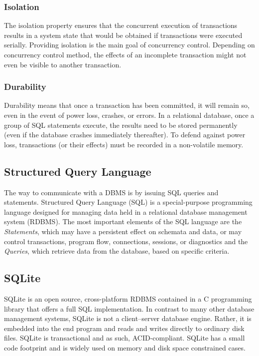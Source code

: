     \subsubsection{Isolation}
      The isolation property ensures that the concurrent execution of transactions results in a system state that would be obtained if transactions were executed serially. Providing isolation is the main goal of concurrency control. Depending on concurrency control method, the effects of an incomplete transaction might not even be visible to another transaction.

    \subsubsection{Durability}
      Durability means that once a transaction has been committed, it will remain so, even in the event of power loss, crashes, or errors. In a relational database, once a group of SQL statements execute, the results need to be stored permanently (even if the database crashes immediately thereafter). To defend against power loss, transactions (or their effects) must be recorded in a non-volatile memory.

  \subsection{Structured Query Language}
    The way to communicate with a DBMS is by issuing SQL queries and statements.
    Structured Query Language (SQL) is a special-purpose programming language designed for managing data held in a relational database management system (RDBMS). The most important elements of the SQL language are the \emph{Statements}, which may have a persistent effect on schemata and data, or may control transactions, program flow, connections, sessions, or diagnostics and the \emph{Queries}, which retrieve data from the database, based on specific criteria.

  \subsection{SQLite}
    SQLite\cite{sqlite} is an open source, cross-platform RDBMS contained in a C programming library that offers a full SQL implementation. In contrast to many other database management systems, SQLite is not a client–server database engine. Rather, it is embedded into the end program and reads and writes directly to ordinary disk files. SQLite is transactional and as such, ACID-compliant. SQLite has a small code footprint and is widely used on memory and disk space constrained cases.
